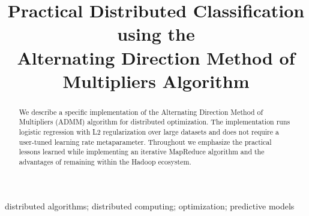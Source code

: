 \documentclass[10pt, conference, compsocconf]{IEEEtran}
\begin{document}
%
\title{Practical Distributed Classification using the\\ Alternating Direction Method of Multipliers Algorithm}



\author{
}






\maketitle


\begin{abstract}
We describe a specific implementation of the Alternating Direction Method of Multipliers (ADMM) algorithm for distributed optimization.  The implementation runs logistic regression with L2 regularization over large datasets and does not require a user-tuned learning rate metaparameter.  Throughout we emphasize the practical lessons learned while implementing an iterative MapReduce algorithm and the advantages of remaining within the Hadoop ecosystem.
\end{abstract}

\begin{IEEEkeywords}
distributed algorithms; distributed computing; optimization; predictive models
\end{IEEEkeywords}


%
\IEEEpeerreviewmaketitle
\end{document}
